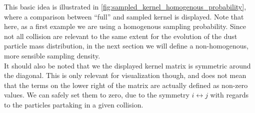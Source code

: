 





    This basic idea is illustrated in \cref{fig:sampled_kernel_homogenous_probability}, where a 
    comparison between ``full'' and sampled kernel is displayed.
    Note that here, as a first example we are using a homogenous sampling probability.
    Since not all collision are relevant to the same extent for the evolution of the
    dust particle mass distribution, in the next section we will define a non-homogenous,
    more sensible sampling density. \\

    It should also be noted that we the displayed kernel matrix is symmetric around the 
    diagonal. This is only relevant for visualization though, and does not mean that the
    terms on the lower right of the matrix are actually defined as non-zero values.
    We can safely set them to zero, due to the symmetry $i\leftrightarrow j$ with regards
    to the particles partaking in a given collision. 


